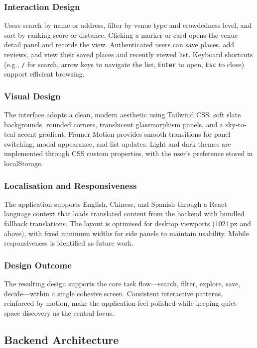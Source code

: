 \documentclass[conference]{IEEEtran}
\begin{document}
\subsubsection{Interaction Design}
Users search by name or address, filter by venue type and crowdedness level, and sort by ranking score or distance. Clicking a marker or card opens the venue detail panel and records the view. Authenticated users can save places, add reviews, and view their saved places and recently viewed list. Keyboard shortcuts (e.g., \texttt{/} for search, arrow keys to navigate the list, \texttt{Enter} to open, \texttt{Esc} to close) support efficient browsing.

\subsubsection{Visual Design}
The interface adopts a clean, modern aesthetic using Tailwind CSS: soft slate backgrounds, rounded corners, translucent glassmorphism panels, and a sky-to-teal accent gradient. Framer Motion provides smooth transitions for panel switching, modal appearance, and list updates. Light and dark themes are implemented through CSS custom properties, with the user's preference stored in localStorage.

\subsubsection{Localisation and Responsiveness}
The application supports English, Chinese, and Spanish through a React language context that loads translated content from the backend with bundled fallback translations. The layout is optimised for desktop viewports (1024\,px and above), with fixed minimum widths for side panels to maintain usability. Mobile responsiveness is identified as future work.

\subsubsection{Design Outcome}
The resulting design supports the core task flow---search, filter, explore, save, decide---within a single cohesive screen. Consistent interactive patterns, reinforced by motion, make the application feel polished while keeping quiet-space discovery as the central focus.

\subsection{Backend Architecture}
\end{document}
